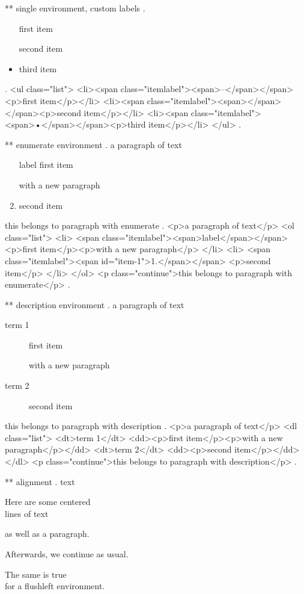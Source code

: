 ** single environment, custom labels
.
\begin{itemize}
    \item[\textendash] first item
    \item[] second item
    \item third item
\end{itemize}
.
<ul class="list">
<li><span class="itemlabel"><span>–</span></span><p>ﬁrst item</p></li>
<li><span class="itemlabel"><span></span></span><p>second item</p></li>
<li><span class="itemlabel"><span>•</span></span><p>third item</p></li>
</ul>
.



** enumerate environment
.
a paragraph of text

\begin{enumerate}
    \item[label] first item

        with a new paragraph
    \item second item
\end{enumerate}
this belongs to paragraph with enumerate
.
<p>a paragraph of text</p>
<ol class="list">
<li>
<span class="itemlabel"><span>label</span></span>
<p>ﬁrst item</p><p>with a new paragraph</p>
</li>
<li>
<span class="itemlabel"><span id="item-1">1.</span></span>
<p>second item</p>
</li>
</ol>
<p class="continue">this belongs to paragraph with enumerate</p>
.


** description environment
.
a paragraph of text

\begin{description}
    \item[term 1] first item

        with a new paragraph
    \item[term 2] second item
\end{description}
this belongs to paragraph with description
.
<p>a paragraph of text</p>
<dl class="list">
<dt>term 1</dt>
<dd><p>ﬁrst item</p><p>with a new paragraph</p></dd>
<dt>term 2</dt>
<dd><p>second item</p></dd>
</dl>
<p class="continue">this belongs to paragraph with description</p>
.




** alignment
.
text
\begin{center}
    Here are some centered\\
    lines of text

    as well as a paragraph.
\end{center}
Afterwards, we continue as usual.
\begin{flushleft}
    The same is true\\
    for a flushleft environment.
\end{flushleft}

